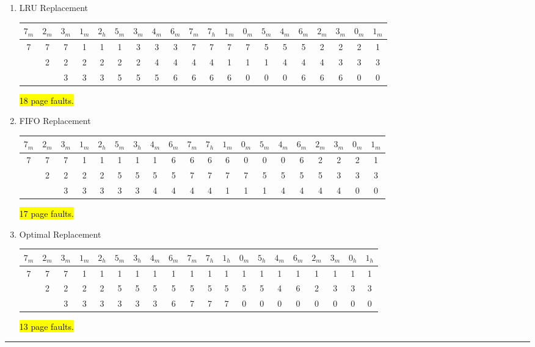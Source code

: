 \documentclass[12pt]{jhwhw}
\begin{document}
	\begin{enumerate}
		\item LRU Replacement \\
			\begin{addmargin}[-3em]{}
			\begin{tabular}{|c|c|c|c|c|c|c|c|c|c|c|c|c|c|c|c|c|c|c|c|}
				\hline
				$7_m$ & $2_m$ & $3_m$ & $1_m$ & $2_h$ & $5_m$ & 
				$3_m$ & $4_m$ & $6_m$ & $7_m$ & $7_h$ & $1_m$ & 
				$0_m$ & $5_m$ & $4_m$ & $6_m$ & $2_m$ & $3_m$ & $0_m$ & $1_m$ \\
				\hline\hline
				7&7&7&1&1&1&3&3&3&7&7&7&7&5&5&5&2&2&2&1\\ \hline
				 &2&2&2&2&2&2&4&4&4&4&1&1&1&4&4&4&3&3&3\\ \hline
				 & &3&3&3&5&5&5&6&6&6&6&0&0&0&6&6&6&0&0\\ \hline
			\end{tabular}
			\end{addmargin}
			\hl{18 page faults.}
		\item FIFO Replacement \\
			\begin{addmargin}[-3em]{}
			\begin{tabular}{|c|c|c|c|c|c|c|c|c|c|c|c|c|c|c|c|c|c|c|c|}
				\hline
				$7_m$ & $2_m$ & $3_m$ & $1_m$ & $2_h$ & $5_m$ & 
				$3_h$ & $4_m$ & $6_m$ & $7_m$ & $7_h$ & $1_m$ & 
				$0_m$ & $5_m$ & $4_m$ & $6_m$ & $2_m$ & $3_m$ & $0_m$ & $1_m$ \\
				\hline\hline
				 7&7&7&1&1&1&1&1&6&6&6&6&0&0&0&6&2&2&2&1\\ \hline
				  &2&2&2&2&5&5&5&5&7&7&7&7&5&5&5&5&3&3&3\\ \hline
				  & &3&3&3&3&3&4&4&4&4&1&1&1&4&4&4&4&0&0\\ \hline
			\end{tabular}
			\end{addmargin}
			\hl{17 page faults.}
		\item Optimal Replacement \\
			\begin{addmargin}[-3em]{}
			\begin{tabular}{|c|c|c|c|c|c|c|c|c|c|c|c|c|c|c|c|c|c|c|c|}
				\hline
				$7_m$ & $2_m$ & $3_m$ & $1_m$ & $2_h$ & $5_m$ & 
				$3_h$ & $4_m$ & $6_m$ & $7_m$ & $7_h$ & $1_h$ & 
				$0_m$ & $5_h$ & $4_m$ & $6_m$ & $2_m$ & $3_m$ & $0_h$ & $1_h$ \\
				\hline\hline
				7&7&7&1&1&1&1&1&1&1&1&1&1&1&1&1&1&1&1&1\\ \hline
				 &2&2&2&2&5&5&5&5&5&5&5&5&5&4&6&2&3&3&3\\ \hline
				 & &3&3&3&3&3&3&6&7&7&7&0&0&0&0&0&0&0&0\\ \hline
			\end{tabular}
			\end{addmargin}
			\hl{13 page faults.}
	\end{enumerate}
\textcolor[RGB]{240,240,240}{\rule{\textwidth}{0.5pt}}\bigbreak
\end{document}
